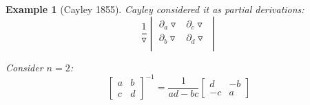 \documentclass[a4paper,landscape,twocolumn]{article}
\newtheorem{ex}{Example}
\begin{document}
\begin{ex}[Cayley 1855]
  Cayley considered it as partial derivations:
  \[
    \frac{1}{\triangledown}
    \begin{vmatrix}
      \partial_a \triangledown & \partial_c \triangledown \\
      \partial_b \triangledown & \partial_d \triangledown \\
    \end{vmatrix}
  \]

  Consider $n=2$:
  \[
    \begin{bmatrix}
      a & b \\
      c & d
    \end{bmatrix}^{-1}
    = \frac{1}{ad - bc}
    \begin{bmatrix}
      d & -b \\
      -c & a
    \end{bmatrix}
  \]


\end{ex}
\end{document}

